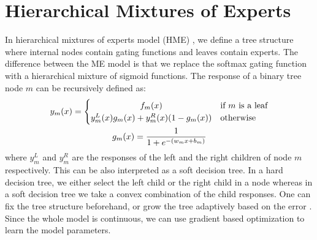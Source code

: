 \documentclass[a4paper,onesided,12pt]{report}
\begin{document}
\section{Hierarchical Mixtures of Experts}
\label{sec:hme}
In hierarchical mixtures of experts model (HME) \cite{jordan1994hierarchical}, we define a tree structure where internal nodes contain gating functions and leaves contain experts. The difference between the ME model is that we replace the softmax gating function with a hierarchical mixture of sigmoid functions. The response of a binary tree node $m$ can be recursively defined as:
\begin{gather}
y_m(x)=
	\begin{cases}
		\hfil f_m(x) &\text{if $m$ is a leaf} \\
		\hfil y_m^{L}(x)g_m(x) + y_m^{R}(x)(1 - g_m(x)) &\text{otherwise}
	\end{cases}\\
g_m(x) = \frac{1}{1+e^{-(w_m x + b_m)}}
\end{gather}
where $y_m^L$ and $y_m^R$ are the responses of the left and the right children of node $m$ respectively. This can be also interpreted as a soft decision tree. In a hard decision tree, we either select the left child or the right child in a node whereas in a soft decision tree we take a convex combination of the child responses. One can fix the tree structure beforehand, or grow the tree adaptively based on the error \cite{irsoy2012soft,irsoy2014budding}. Since the whole model is continuous, we can use gradient based optimization to learn the model parameters.
%
\end{document}
